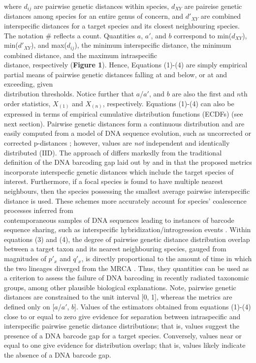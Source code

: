 \documentclass[12pt]{article}
\begin{document}
\noindent where $d_{ij}$ are pairwise genetic distances within species, $d_{XY}$ are paireise genetic distances among species for an entire genus of concern, and $d'_{XY}$ are combined interspecific distances for a target species and its closest neighbouring species. The notation \# reflects a count.  Quantities $a$, $a'$, and $b$ correspond to min($d_{XY}$), min($d'_{XY}$), and max($d_{ij}$), the minimum interspecific distance, the minimum combined distance, and the maximum intraspecific \\ distance, respectively (\textbf{Figure 1}). Hence, Equations (1)-(4) are simply empirical partial means of pairwise genetic distances falling at and below, or at and exceeding, given \\ distribution thresholds. Notice further that $a$/$a'$, and $b$ are also the first and $n$th order statistics, $X_{(1)}$ and $X_{(n)}$, respectively. Equations (1)-(4) can also be expressed in terms of empirical cumulative distribution functions (ECDFs) (see next section). Pairwise genetic distances form a continuous distribution and are easily computed from a model of DNA sequence evolution, such as uncorrected or corrected p-distances \citep{jukes1969evolution, kimura1980simple}; however, values are \textit{not} independent and identically distributed (IID). The approach of \citet{phillips2024measure} differs markedly from the traditional definition of the DNA barcoding gap laid out by \citet{meyer2005dna} and \citet{meier2008use} in that the proposed metrics incorporate interspecfic genetic distances which include the target species of interest. Furthermore, if a focal species is found to have multiple nearest neighbours, then the species possessing the smallest average pairwise interspecific distance is used. These schemes more accurately account for species' coalescence processes inferred from \\ contemporaneous samples of DNA sequences leading to instances of barcode sequence sharing, such as interspecific hybridization/introgression events \citep{phillips2024measure}. Within \\ equations (3) and (4), the degree of pairwise genetic distance distribution overlap between a target taxon and its nearest neighbouring species, gauged from magnitudes of $p'_x$ and $q'_x$, is directly proportional to the amount of time in which the two lineages diverged from the MRCA \citep{phillips2024measure}. Thus, they quantities can be used as a criterion to assess the failure of DNA barcoding in recently radiated taxonomic groups, among other plausible biological explanations.  Note, pairwise genetic distances are constrained to the unit interval [0, 1], whereas the metrics are defined only on [$a$/$a'$, $b$]. Values of the estimators obtained from equations (1)-(4) close to or equal to zero give evidence for separation between intraspecific and interspecific pairwise genetic distance distributions; that is, values suggest the presence of a DNA barcode gap for a target species. Conversely, values near or equal to one give evidence for distribution overlap; that is, values likely indicate the absence of a DNA barcode gap. 
\end{document}
